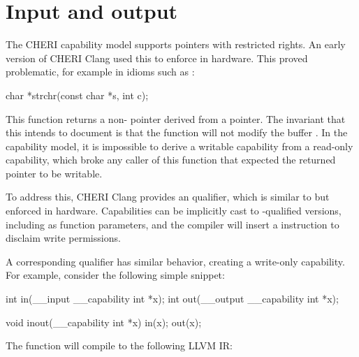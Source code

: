\section{Input and output}

The CHERI capability model supports pointers with restricted rights.
An early version of CHERI Clang used this to enforce  in hardware.
This proved problematic, for example in idioms such as :

\begin{csnippet}
char *strchr(const char *s, int c);
\end{csnippet}

This function returns a non- pointer derived from a  pointer.
The invariant that this intends to document is that the  function will not modify the buffer .
In the capability model, it is impossible to derive a writable capability from a read-only capability, which broke any caller of this function that expected the returned pointer to be writable.

To address this, CHERI Clang provides an  qualifier, which is similar to  but enforced in hardware.
Capabilities can be implicitly cast to -qualified versions, including as function parameters, and the compiler will insert a  instruction to disclaim write permissions.

A corresponding  qualifier has similar behavior, creating a write-only capability.
For example, consider the following simple snippet:

\begin{csnippet}
int in(__input __capability int *x);
int out(__output __capability int *x);

void inout(__capability int *x)
{
	in(x);
	out(x);
}
\end{csnippet}

The  function will compile to the following LLVM IR:


